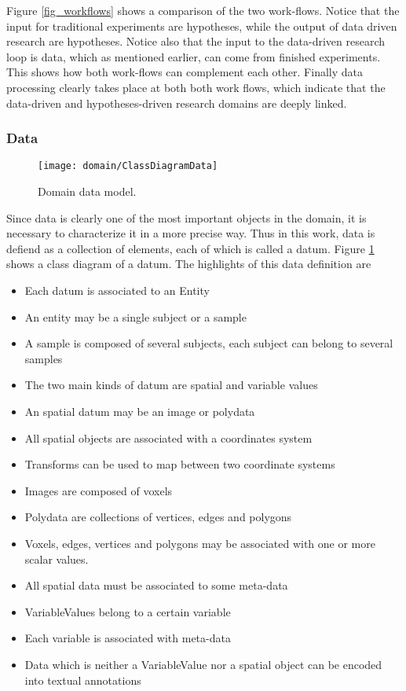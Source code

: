 Figure \ref{fig_workflows} shows a comparison of the two work-flows. Notice that the input for traditional experiments are hypotheses, while the output of data driven research are  hypotheses. Notice also that the input to the data-driven research loop is data, which as mentioned earlier, can come from finished experiments. This shows how both work-flows can complement each other. Finally data processing clearly takes place at both both work flows, which indicate that the data-driven and hypotheses-driven research domains are deeply linked.  

\subsubsection{Data}
\begin{figure}
\centering
\texttt{[image: domain/ClassDiagramData]}
\caption{\label{fig_datum_class} Domain data model.}
\end{figure}

Since data is clearly one of the most important objects in the domain, it is necessary to characterize it in a more precise way. Thus in this work, data is defiend as a collection of elements, each of which is called a datum. Figure \ref{fig_datum_class} shows a class diagram of a datum. The highlights of this data definition are


\begin{itemize}
\item Each datum is associated to an Entity
\item An entity may be a single subject or a sample
\item A sample is composed of several subjects, each subject can belong to several samples
\item The two main kinds of datum are spatial and variable values
\item An spatial datum may be an image or polydata
\item All spatial objects are associated with a coordinates system
\item Transforms can be used to map between two coordinate systems
\item Images are composed of voxels
\item Polydata are collections of vertices, edges and polygons
\item Voxels, edges, vertices and polygons may be associated with one or more scalar values.
\item All spatial data must be associated to some meta-data
\item VariableValues belong to a certain variable
\item Each variable is associated with meta-data  
\item Data which is neither a VariableValue nor a spatial object can be encoded into textual annotations
\end{itemize} 

